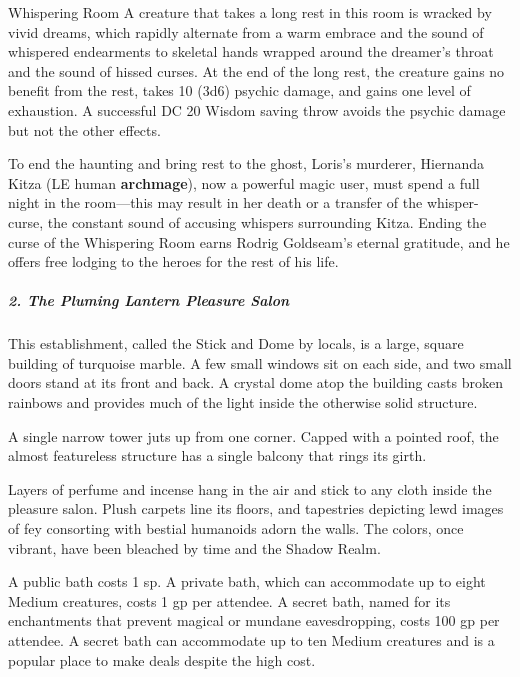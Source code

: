 \documentclass[10pt,a4paper,twoside,bg=print,twocolumn,openany,nodeprecatedcode]{dndbook}
\begin{document}
\begin{DndSidebar}[float=!b]{Whispering Room}
A creature that takes a long rest in this room is wracked by vivid dreams, which rapidly alternate from a warm embrace and the sound of whispered endearments to skeletal hands wrapped around the dreamer's throat and the sound of hissed curses. At the end of the long rest, the creature gains no benefit from the rest, takes 10 (3d6) psychic damage, and gains one level of exhaustion. A successful DC 20 Wisdom saving throw avoids the psychic damage but not the other effects.



To end the haunting and bring rest to the ghost, Loris's murderer, Hiernanda Kitza (LE human \textbf{archmage}), now a powerful magic user, must spend a full night in the room—this may result in her death or a transfer of the whisper-curse, the constant sound of accusing whispers surrounding Kitza. Ending the curse of the Whispering Room earns Rodrig Goldseam's eternal gratitude, and he offers free lodging to the heroes for the rest of his life.



\end{DndSidebar}

\subparagraph{2. The Pluming Lantern Pleasure Salon}
This establishment, called the Stick and Dome by locals, is a large, square building of turquoise marble. A few small windows sit on each side, and two small doors stand at its front and back. A crystal dome atop the building casts broken rainbows and provides much of the light inside the otherwise solid structure.

A single narrow tower juts up from one corner. Capped with a pointed roof, the almost featureless structure has a single balcony that rings its girth.

Layers of perfume and incense hang in the air and stick to any cloth inside the pleasure salon. Plush carpets line its floors, and tapestries depicting lewd images of fey consorting with bestial humanoids adorn the walls. The colors, once vibrant, have been bleached by time and the Shadow Realm.

A public bath costs 1 sp. A private bath, which can accommodate up to eight Medium creatures, costs 1 gp per attendee. A secret bath, named for its enchantments that prevent magical or mundane eavesdropping, costs 100 gp per attendee. A secret bath can accommodate up to ten Medium creatures and is a popular place to make deals despite the high cost.
\end{document}
